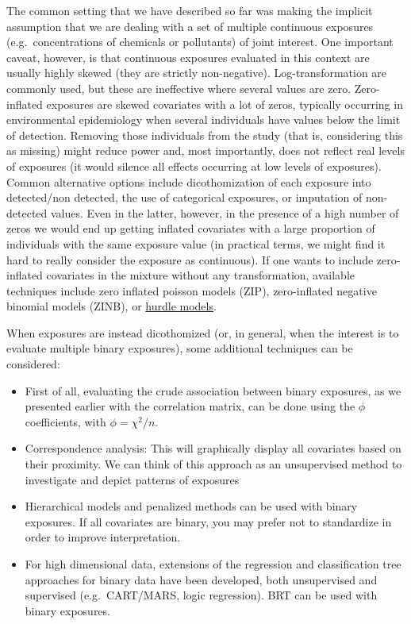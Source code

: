 \documentclass[
]{book}
\providecommand{\tightlist}{%
  \setlength{\itemsep}{0pt}\setlength{\parskip}{0pt}}
\begin{document}
The common setting that we have described so far was making the implicit assumption that we are dealing with a set of multiple continuous exposures (e.g.~concentrations of chemicals or pollutants) of joint interest. One important caveat, however, is that continuous exposures evaluated in this context are usually highly skewed (they are strictly non-negative). Log-transformation are commonly used, but these are ineffective where several values are zero. Zero-inflated exposures are skewed covariates with a lot of zeros, typically occurring in environmental epidemiology when several individuals have values below the limit of detection. Removing those individuals from the study (that is, considering this as missing) might reduce power and, most importantly, does not reflect real levels of exposures (it would silence all effects occurring at low levels of exposures). Common alternative options include dicothomization of each exposure into detected/non detected, the use of categorical exposures, or imputation of non-detected values. Even in the latter, however, in the presence of a high number of zeros we would end up getting inflated covariates with a large proportion of individuals with the same exposure value (in practical terms, we might find it hard to really consider the exposure as continuous). If one wants to include zero-inflated covariates in the mixture without any transformation, available techniques include zero inflated poisson models (ZIP), zero-inflated negative binomial models (ZINB), or \href{https://data.library.virginia.edu/getting-started-with-hurdle-models/}{hurdle models}.

When exposures are instead dicothomized (or, in general, when the interest is to evaluate multiple binary exposures), some additional techniques can be considered:

\begin{itemize}
\tightlist
\item
  First of all, evaluating the crude association between binary exposures, as we presented earlier with the correlation matrix, can be done using the \(\phi\) coefficients, with \(\phi=\chi^2/n\).
\item
  Correspondence analysis: This will graphically display all covariates based on their proximity. We can think of this approach as an unsupervised method to investigate and depict patterns of exposures
\item
  Hierarchical models and penalized methods can be used with binary exposures. If all covariates are binary, you may prefer not to standardize in order to improve interpretation.\\
\item
  For high dimensional data, extensions of the regression and classification tree approaches for binary data have been developed, both unsupervised and supervised (e.g.~CART/MARS, logic regression). BRT can be used with binary exposures.
\end{itemize}
\end{document}
